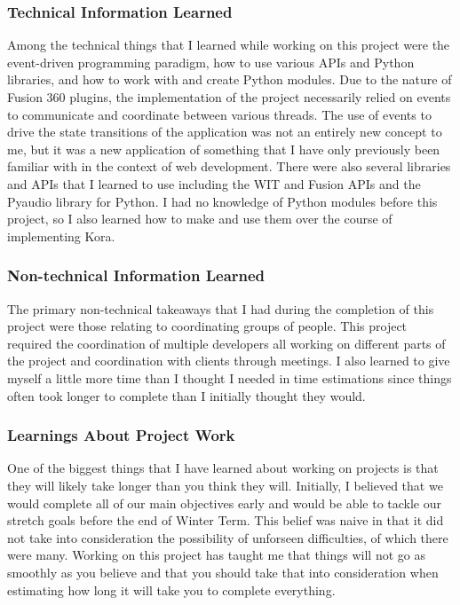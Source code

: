 \documentclass[onecolumn, draftclsnofoot,10pt, compsoc]{IEEEtran}
\begin{document}
	\subsubsection{Technical Information Learned}
		Among the technical things that I learned while working on this project were the event-driven programming paradigm, how to use various APIs and Python libraries, and how to work with and create Python modules.
		Due to the nature of Fusion 360 plugins, the implementation of the project necessarily relied on events to communicate and coordinate between various threads.
		The use of events to drive the state transitions of the application was not an entirely new concept to me, but it was a new application of something that I have only previously been familiar with in the context of web development.
		There were also several libraries and APIs that I learned to use including the WIT and Fusion APIs and the Pyaudio library for Python.
		I had no knowledge of Python modules before this project, so I also learned how to make and use them over the course of implementing Kora.

	\subsubsection{Non-technical Information Learned}
		The primary non-technical takeaways that I had during the completion of this project were those relating to coordinating groups of people.
		This project required the coordination of multiple developers all working on different parts of the project and coordination with clients through meetings.
		I also learned to give myself a little more time than I thought I needed in time estimations since things often took longer to complete than I initially thought they would.

	\subsubsection{Learnings About Project Work}
		One of the biggest things that I have learned about working on projects is that they will likely take longer than you think they will.
		Initially, I believed that we would complete all of our main objectives early and would be able to tackle our stretch goals before the end of Winter Term.
		This belief was naive in that it did not take into consideration the possibility of unforseen difficulties, of which there were many.
		Working on this project has taught me that things will not go as smoothly as you believe and that you should take that into consideration when estimating how long it will take you to complete everything.
\end{document}
